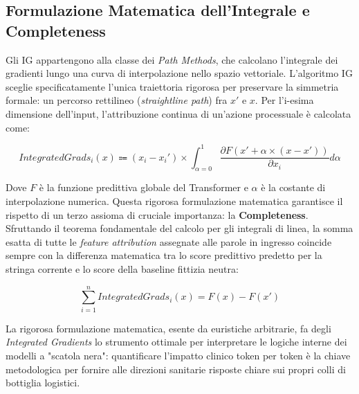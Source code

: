 \subsection{Formulazione Matematica dell'Integrale e Completeness}
Gli IG appartengono alla classe dei \textit{Path Methods}, che calcolano l'integrale dei gradienti lungo una curva di interpolazione nello spazio vettoriale. L'algoritmo IG sceglie specificatamente l'unica traiettoria rigorosa per preservare la simmetria formale: un percorso rettilineo (\textit{straightline path}) fra $x'$ e $x$. Per l'i-esima dimensione dell'input, l'attribuzione continua di un'azione processuale è calcolata come:

\begin{equation}
IntegratedGrads_i(x) \Coloneqq (x_i - x_i') \times \int_{\alpha=0}^{1} \frac{\partial F(x' + \alpha \times (x - x'))}{\partial x_i} d\alpha
\end{equation}

Dove $F$ è la funzione predittiva globale del Transformer e $\alpha$ è la costante di interpolazione numerica. Questa rigorosa formulazione matematica garantisce il rispetto di un terzo assioma di cruciale importanza: la \textbf{Completeness}. Sfruttando il teorema fondamentale del calcolo per gli integrali di linea, la somma esatta di tutte le \textit{feature attribution} assegnate alle parole in ingresso coincide sempre con la differenza matematica tra lo score predittivo predetto per la stringa corrente e lo score della baseline fittizia neutra:

\begin{equation}
\sum_{i=1}^{n} IntegratedGrads_i(x) = F(x) - F(x')
\end{equation}

La rigorosa formulazione matematica, esente da euristiche arbitrarie, fa degli \textit{Integrated Gradients} lo strumento ottimale per interpretare le logiche interne dei modelli a "scatola nera": quantificare l'impatto clinico token per token è la chiave metodologica per fornire alle direzioni sanitarie risposte chiare sui propri colli di bottiglia logistici.


